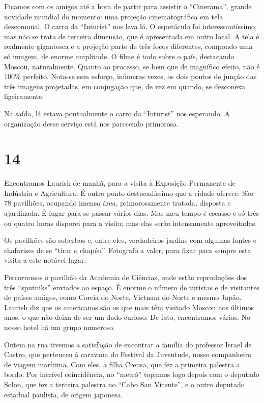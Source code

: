 Ficamos com os amigos até a hora de partir para assistir o ``Cinerama'', grande novidade mundial do momento: uma projeção cinematográfica em tela descomunal. O carro da ``Inturist'' nos leva lá. O espetáculo foi interessantíssimo, mas não se trata de terceira dimensão, que é apresentada em outro local. A tela é realmente gigantesca e a projeção parte de três focos diferentes, compondo uma só imagem, de enorme amplitude. O filme é todo sobre o país, destacando Moscou, naturalmente. Quanto ao processo, se bem que de magnífico efeito, não é 100\% perfeito. Nota-se sem esforço, inúmeras vezes, os dois pontos de junção das três imagens projetadas, em conjugação que, de vez em quando, se desconexa ligeiramente.

Na saída, lá estava pontualmente o carro da ``Inturist'' nos esperando. A organização desse serviço está nos parecendo primorosa.

\section*{14 \adfflatleafright {}}
Encontramos Laurish de manhã, para a visita à Exposição Permanente de Indústria e Agricultura. É outro ponto destacadíssimo que a cidade oferece. São 78 pavilhões, ocupando imensa área, primorosamente tratada, disposta e ajardinada. É lugar para se passar vários dias. Mas meu tempo é escasso e só três ou quatro horas disporei para a visita; mas elas serão intensamente aproveitadas.

Os pavilhões são soberbos e, entre eles, verdadeiros jardins com algumas fontes e chafarizes de se ``tirar o chapéu''. Fotografo a valer, para fixar para sempre esta visita a este notável lugar.

Percorremos o pavilhão da Academia de Ciências, onde estão reproduções dos três ``sputniks'' enviados ao espaço. É enorme o número de turistas e de visitantes de países amigos, como Coreia do Norte, Vietnam do Norte e mesmo Japão. Laurish diz que os americanos são os que mais têm visitado Moscou nos últimos anos, o que não deixa de ser um dado curioso. De fato, encontramos vários. No nosso hotel há um grupo numeroso.

Ontem na rua tivemos a satisfação de encontrar a família do professor Israel de Castro, que pertenceu à caravana do Festival da Juventude, nosso companheiro de viagem marítima. Com eles, a filha Creusa, que fez a primeira palestra a bordo. Por incrível coincidência, no ``metrô'' topamos logo depois com o deputado Solon, que fez a terceira palestra no ``Cabo San Vicente'', e o outro deputado estadual paulista, de origem japonesa.

